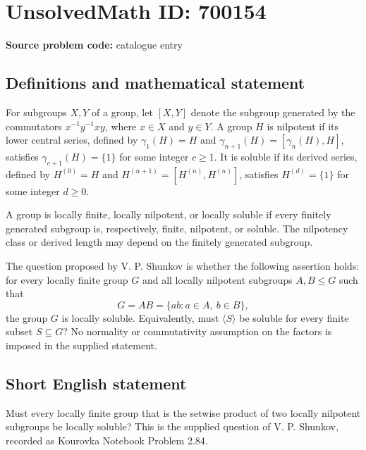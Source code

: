 \documentclass[11pt]{article}
\begin{document}
\section*{UnsolvedMath ID: 700154}
\textbf{Source problem code:} catalogue entry
\subsection{Definitions and mathematical statement}
For subgroups \(X,Y\) of a group, let \([X,Y]\) denote the subgroup generated by the commutators \(x^{-1}y^{-1}xy\), where \(x\in X\) and \(y\in Y\). A group \(H\) is nilpotent if its lower central series, defined by \(\gamma_1(H)=H\) and \(\gamma_{n+1}(H)=[\gamma_n(H),H]\), satisfies \(\gamma_{c+1}(H)=\{1\}\) for some integer \(c\geq 1\). It is soluble if its derived series, defined by \(H^{(0)}=H\) and \(H^{(n+1)}=[H^{(n)},H^{(n)}]\), satisfies \(H^{(d)}=\{1\}\) for some integer \(d\geq 0\).

A group is locally finite, locally nilpotent, or locally soluble if every finitely generated subgroup is, respectively, finite, nilpotent, or soluble. The nilpotency class or derived length may depend on the finitely generated subgroup.

The question proposed by V. P. Shunkov is whether the following assertion holds: for every locally finite group \(G\) and all locally nilpotent subgroups \(A,B\leq G\) such that
\[
G=AB=\{ab:a\in A,\ b\in B\},
\]
the group \(G\) is locally soluble. Equivalently, must \(\langle S\rangle\) be soluble for every finite subset \(S\subseteq G\)? No normality or commutativity assumption on the factors is imposed in the supplied statement.
\subsection{Short English statement}
Must every locally finite group that is the setwise product of two locally nilpotent subgroups be locally soluble? This is the supplied question of V. P. Shunkov, recorded as Kourovka Notebook Problem 2.84.
\end{document}
